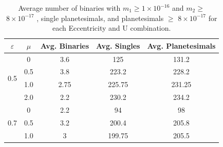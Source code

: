 \documentclass[fleqn,usenatbib]{mnras}
\begin{document}

\begin{table}
\centering
\caption{Average number of binaries  with $m_1 \geq 1\times10^{-16}$ and $m_2 \geq$ $8\times10^{-17}$ , single planetesimals, and planetesimals $\geq$ $8\times10^{-17}$ for each Eccentricity and U combination.}
\label{tab:planetesimals_averages}
\begin{tabular}{c c c c c }
\toprule
$\varepsilon$ & $\mu$ & {Avg. Binaries} & {Avg. Singles} & {Avg. Planetesimals} \\
\midrule
\multirow{4}{*}{0.5}  & 0   & 3.6   & 125    & 131.2  \\
                      & 0.5 & 3.8   & 223.2  & 228.2  \\
                      & 1.0 &  2.75 & 225.75 & 231.25 \\
                      & 2.0 &  2.2  & 230.2  & 234.2  \\
\midrule
\multirow{3}{*}{0.7}  & 0   & 2.2 & 94     & 98    \\
                      & 0.5 & 3.2 & 200.4  & 205.8 \\
                      & 1.0 & 3   & 199.75 & 205.5 \\
\bottomrule
\end{tabular}
\end{table}
\end{document}
